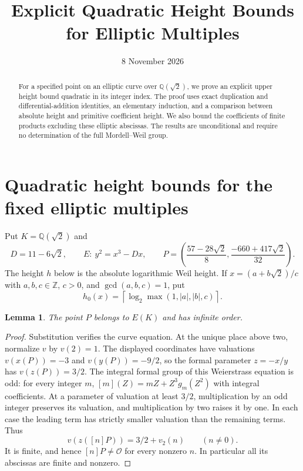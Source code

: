 \documentclass[11pt,a4paper]{article}
\title{Explicit Quadratic Height Bounds\\for Elliptic Multiples}
\author{}\date{8 November 2026}
\newtheorem{lemma}[theorem]{Lemma}
\begin{document}
\maketitle
\begin{abstract}
For a specified point on an elliptic curve over $\mathbb Q(\sqrt2)$,
we prove an explicit upper height bound quadratic in its integer index.
The proof uses exact duplication and differential-addition identities,
an elementary induction, and a comparison between absolute height and
primitive coefficient height. We also bound the coefficients of finite
products excluding these elliptic abscissas. The results are
unconditional and require no determination of the full Mordell--Weil group.
\end{abstract}
\section{Quadratic height bounds for the fixed elliptic multiples}
\label{sec:quadratic-fixed-height}

Put $K=\mathbb Q(\sqrt2)$ and
\[
 D=11-6\sqrt2,\qquad E:\ y^2=x^3-Dx,\qquad
 P=\left(\frac{57-28\sqrt2}{8},
          \frac{-660+417\sqrt2}{32}\right).
\]
The height $h$ below is the absolute logarithmic Weil height. If
$x=(a+b\sqrt2)/c$ with $a,b,c\in\mathbb Z$, $c>0$, and
$\gcd(a,b,c)=1$, put
\[
 h_0(x)=\left\lceil\log_2\max(1,|a|,|b|,c)\right\rceil.
\]

\begin{lemma}\label{lem:fixed-height-nontorsion}
The point $P$ belongs to $E(K)$ and has infinite order.
\end{lemma}
\begin{proof}
Substitution verifies the curve equation. At the unique place above two,
normalize $v$ by $v(2)=1$. The displayed coordinates have valuations
$v(x(P))=-3$ and $v(y(P))=-9/2$, so the formal parameter
$z=-x/y$ has $v(z(P))=3/2$. The integral formal group of this
Weierstrass equation is odd: for every integer $m$,
$[m](Z)=mZ+Z^3g_m(Z^2)$ with integral coefficients.
At a parameter of valuation at least $3/2$, multiplication by an odd
integer preserves its valuation, and multiplication by two raises it
by one. In each case the leading term has strictly smaller valuation
than the remaining terms. Thus
\[
                   v(z([n]P))=3/2+v_2(n)
                   \qquad(n\ne0).
\]
It is finite, and hence $[n]P\ne\mathcal O$ for every nonzero $n$.
In particular all its abscissas are finite and nonzero.
\end{proof}
\end{document}

